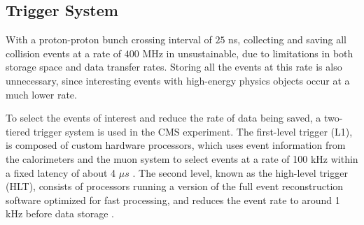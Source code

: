 \subsection{Trigger System}
\label{subsec:trigger_system}

With a proton-proton bunch crossing interval of $25$ ns, collecting and saving all collision events at a rate of $400$ MHz in unsustainable, 
due to limitations in both storage space and data transfer rates. 
Storing all the events at this rate is also unnecessary, since interesting events with high-energy physics objects occur at a much
lower rate.

To select the events of interest and reduce the rate of data being saved, a two-tiered trigger system is used in the CMS experiment. The first-level
trigger (L1), is composed of custom hardware processors, which uses event information from the calorimeters and the muon system to select events at a rate
of 100 kHz within a fixed latency of about 4 $\mu s$ \cite{cms:l1_paper}. The second level, known as the high-level trigger (HLT), consists of processors 
running a version of the full event reconstruction software optimized for fast processing, and reduces the event rate to around 1 kHz before data storage 
\cite{cms:hlt_paper}. 





